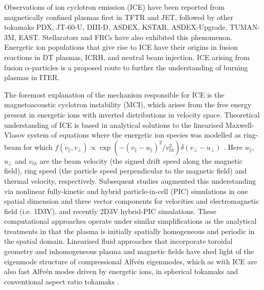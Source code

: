 \documentclass[12pt]{iopart}
\begin{document}
Observations of ion cyclotron emission (ICE) have been reported from
magnetically confined plasmas first in TFTR\cite{Cauffman1995,Dendy1995}
and JET\cite{Cottrell1988,Cottrell1993,Dendy1995}, followed by other tokamaks
PDX\cite{Heidbrink1994}, JT-60-U\cite{Ichimura2008}, DIII-D\cite{Heidbrink2011},
ASDEX\cite{DInca2014}, KSTAR\cite{Chapman2017,Chapman2018},
ASDEX-Upgrade\cite{Ochoukov2018},
TUMAN-3M\cite{Askinazi2018}, EAST\cite{Liu2020}. Stellarators\cite{Saito2013} and
FRCs\cite{Nicks2020} have also exhibited this phenomenon. Energetic ion
populations that give rise to ICE have their origins in fusion
reactions in DT plasmas\cite{Cottrell2000, Cauffman1995},
ICRH\cite{Cottrell2000}, and neutral beam injection\cite{Ochoukov2018}. ICE
arising from fusion $\alpha$-particles is a proposed route to further
the understanding of burning plasmas in ITER\cite{Dendy2015,McClements2015}. 

The foremost explanation of the mechanism responsible for ICE is the
magnetoacoustic cyclotron instability (MCI)\cite{Belikov1976}, which arises from
the free energy present in energetic ions with inverted distributions in
velocity space. Theoretical understanding of ICE is based in analytical
solutions to the linearised Maxwell-Vlasov system of equations\cite{Stix} where
the energetic ion species was modelled as ring-beam for which $f(v_\parallel,
v_\perp) \propto \exp(-(v_\parallel-u_\parallel)^2/ v_{th}^2)\delta(v_\perp -
u_\bot)$ \cite{Dendy1994, McClements1996}. Here $u_\parallel$, $u_\perp$ and
$v_{th}$ are the beam velocity (the signed drift speed along the magnetic
field), ring speed (the particle speed perpendicular to the magnetic field)
and thermal velocity, respectively. Subsequent studies augmented this
understanding via nonlinear fully-kinetic\cite{Cook2013,Chapman2017} and
hybrid\cite{Carbajal2014,Reman2019} particle-in-cell (PIC) simulations in one
spatial dimension and three vector components for velocities and electromagnetic
field (i.e. 1D3V), and recently 2D3V hybrid-PIC simulations\cite{Carbajal2021}. These
computational approaches operate under similar simplifications as the analytical
treatments in that the plasma is initially spatially homogeneous and periodic
in the spatial domain.
Linearised fluid approaches that incorporate toroidal geometry and
inhomogeneous plasma and magnetic fields have shed light of the eigenmode
structure of compressional Alfv{\'e}n eigenmodes, which as with ICE are also fast
Alfv{\'e}n modes driven by energetic ions, in spherical
tokamaks\cite{Sharapov2014, Gorelenkov2016} and conventional aspect ratio
tokamaks \cite{Kolesnichenko2000, Fulop2000, Heidbrink2006}.
\end{document}
